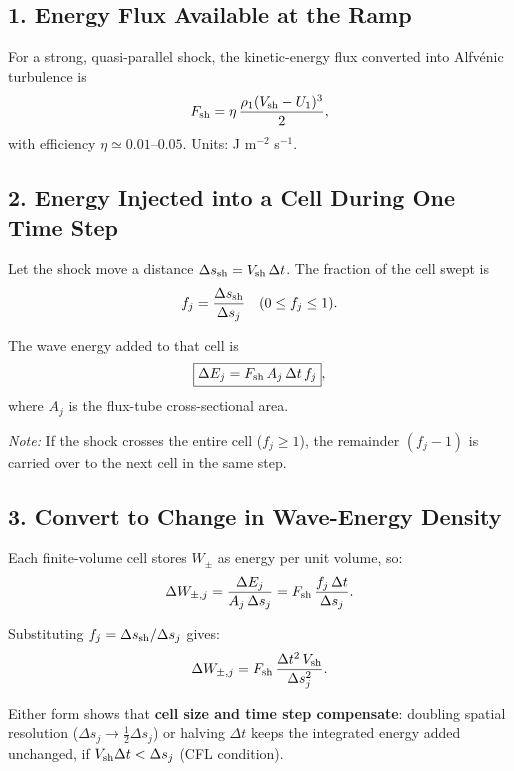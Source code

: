 \subsection*{1. Energy Flux Available at the Ramp}

For a strong, quasi-parallel shock, the kinetic-energy flux converted into Alfvénic turbulence is
\begin{equation}
F_{\rm sh} = \eta\,\frac{\rho_{1}(V_{\rm sh}-U_{1})^{3}}{2},
\end{equation}
with efficiency $\eta\simeq0.01$–$0.05$. Units: J m$^{-2}$ s$^{-1}$.

\subsection*{2. Energy Injected into a Cell During One Time Step}

Let the shock move a distance $\Delta s_{\rm sh} = V_{\rm sh}\,\Delta t$.  
The fraction of the cell swept is
\begin{equation}
f_j = \frac{\Delta s_{\rm sh}}{\Delta s_j} \quad (0 \le f_j \le 1).
\end{equation}

The wave energy added to that cell is
\begin{equation}
\boxed{\Delta E_j = F_{\rm sh}\,A_j\,\Delta t\,f_j},
\end{equation}
where $A_j$ is the flux-tube cross-sectional area.

\smallskip
\textit{Note:} If the shock crosses the entire cell ($f_j \ge 1$), the remainder $(f_j - 1)$ is carried over to the next cell in the same step.

\subsection*{3. Convert to Change in Wave-Energy Density}

Each finite-volume cell stores $W_\pm$ as energy per unit volume, so:
\begin{equation}
\Delta W_{\pm,j} = \frac{\Delta E_j}{A_j\,\Delta s_j} = F_{\rm sh}\,\frac{f_j\,\Delta t}{\Delta s_j}.
\end{equation}

Substituting $f_j = \Delta s_{\rm sh}/\Delta s_j$ gives:
\begin{equation}
\Delta W_{\pm,j} = F_{\rm sh}\,\frac{\Delta t^2\,V_{\rm sh}}{\Delta s_j^2}.
\end{equation}

Either form shows that \textbf{cell size and time step compensate}: doubling spatial resolution ($\Delta s_j \to \tfrac{1}{2}\Delta s_j$) or halving $\Delta t$ keeps the integrated energy added unchanged, if $V_{\rm sh} \Delta t < \Delta s_j$ (CFL condition).

